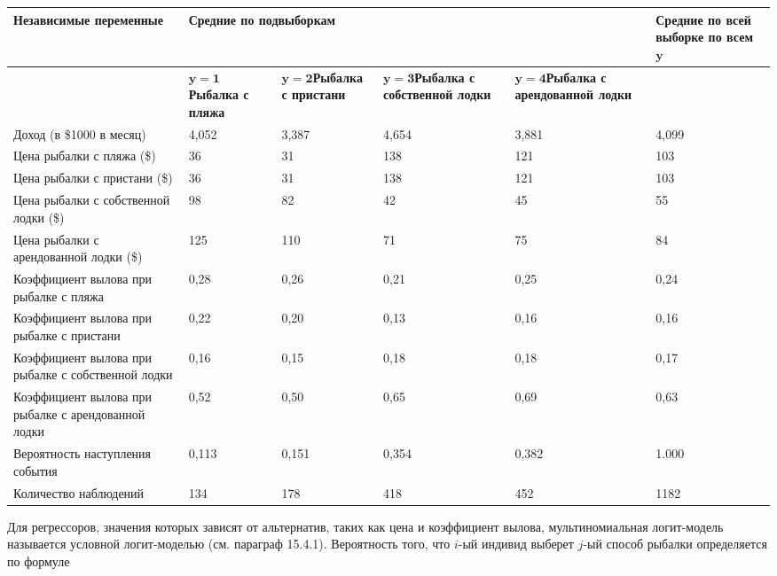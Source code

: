 \begin{tabular}{|p{1.3in}|p{0.5in}|p{0.5in}|p{0.7in}|p{0.8in}|p{0.7in}|} \hline 
\textbf{Независимые переменные} & \multicolumn{4}{|p{2.5in}|}{\textbf{Средние по подвыборкам}} & \textbf{Средние по всей выборке по всем }${\mathbf y}$  \\ \hline 
 & ${\mathbf y}{\mathbf =}{\mathbf 1}$\textbf{\newline Рыбалка с пляжа} & ${\mathbf y}{\mathbf =}{\mathbf 2}$\textbf{\newline Рыбалка с пристани} & ${\mathbf y}{\mathbf =}{\mathbf 3}$\textbf{\newline Рыбалка с собственной лодки} & ${\mathbf y}{\mathbf =}{\mathbf 4}$\textbf{\newline Рыбалка с арендованной лодки} &   \\ \hline 
Доход (в \$1000 в месяц) & 4,052 & 3,387 & 4,654 & 3,881 & 4,099 \\ \hline 
Цена рыбалки с пляжа (\$) & 36 & 31 & 138 & 121 & 103 \\ \hline 
Цена рыбалки с пристани (\$) & 36 & 31 & 138 & 121 & 103 \\ \hline 
Цена рыбалки с собственной лодки (\$) & 98 & 82 & 42 & 45 & 55 \\ \hline 
Цена рыбалки с арендованной лодки (\$) & 125 & 110 & 71 & 75 & 84 \\ \hline 
Коэффициент вылова при рыбалке с пляжа & 0,28 & 0,26 & 0,21 & 0,25 & 0,24 \\ \hline 
Коэффициент вылова при рыбалке с пристани & 0,22 & 0,20 & 0,13 & 0,16 & 0,16 \\ \hline 
Коэффициент вылова при рыбалке с собственной лодки & 0,16 & 0,15 & 0,18 & 0,18 & 0,17 \\ \hline 
Коэффициент вылова при рыбалке с арендованной лодки & 0,52 & 0,50 & 0,65 & 0,69 & 0,63 \\ \hline 
Вероятность наступления события & 0,113 & 0,151 & 0,354 & 0,382 & 1.000 \\ \hline 
Количество наблюдений & 134 & 178 & 418 & 452 & 1182 \\ \hline 
\end{tabular}



Для регрессоров, значения которых зависят от альтернатив, таких как цена и коэффициент вылова, мультиномиальная логит-модель называется условной логит-моделью (см. параграф 15.4.1). Вероятность того, что $i$-ый индивид выберет $j$-ый способ рыбалки определяется по формуле

